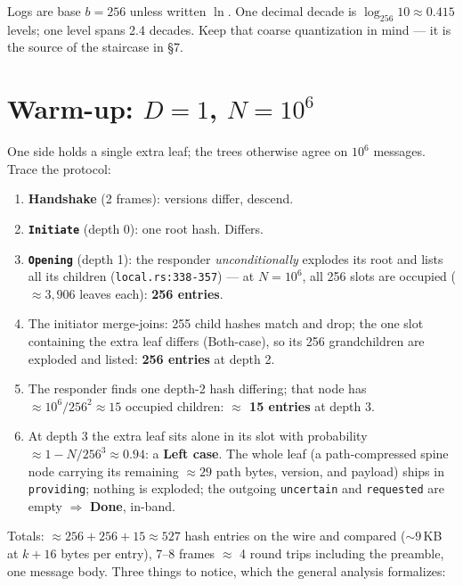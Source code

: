 \documentclass[11pt]{article}
\newcommand{\code}[1]{\texttt{#1}}
\theoremstyle{plain}
\begin{document}
Logs are base $b = 256$ unless written $\ln$. One decimal decade is
$\log_{256} 10 \approx 0.415$ levels; one level spans 2.4 decades. Keep that
coarse quantization in mind --- it is the source of the staircase in \S7.

\section{Warm-up: \texorpdfstring{$D = 1$, $N = 10^6$}{D = 1, N = 10\textasciicircum 6}}

One side holds a single extra leaf; the trees otherwise agree on $10^6$
messages. Trace the protocol:

\begin{enumerate}
\item \textbf{Handshake} (2 frames): versions differ, descend.
\item \textbf{\code{Initiate}} (depth 0): one root hash. Differs.
\item \textbf{\code{Opening}} (depth 1): the responder \emph{unconditionally}
  explodes its root and lists all its children (\code{local.rs:338-357}) ---
  at $N = 10^6$, all 256 slots are occupied ($\approx 3{,}906$ leaves each):
  \textbf{256 entries}.
\item The initiator merge-joins: 255 child hashes match and drop; the one
  slot containing the extra leaf differs (Both-case), so its 256
  grandchildren are exploded and listed: \textbf{256 entries} at depth 2.
\item The responder finds one depth-2 hash differing; that node has
  $\approx 10^6/256^2 \approx 15$ occupied children:
  \textbf{$\approx$ 15 entries} at depth 3.
\item At depth 3 the extra leaf sits alone in its slot with probability
  $\approx 1 - N/256^3 \approx 0.94$: a \textbf{Left case}. The whole leaf
  (a path-compressed spine node carrying its remaining $\approx 29$ path
  bytes, version, and payload) ships in \code{providing}; nothing is
  exploded; the outgoing \code{uncertain} and \code{requested} are empty
  $\Rightarrow$ \textbf{Done}, in-band.
\end{enumerate}

Totals: $\approx 256 + 256 + 15 \approx 527$ hash entries on the wire and
compared (${\sim}9$\,KB at $k + 16$ bytes per entry), 7--8 frames
$\approx$ 4 round trips including the preamble, one message body. Three things to notice, which the general
analysis formalizes:
\end{document}
